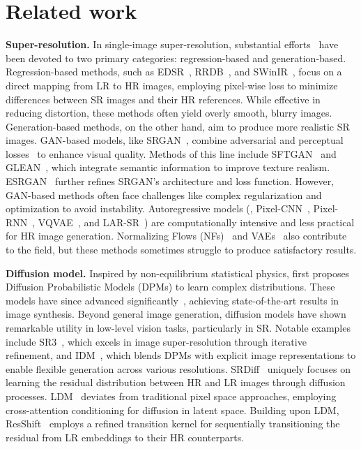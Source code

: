 \section{Related work}
\label{sec:related}
\noindent\textbf{Super-resolution.} 
In single-image super-resolution, substantial efforts~\cite{liang2022details, jo2021tackling, ledig2017photo, zhang2018image, soh2019natural,
ding2022sparsity, ding2021cdfi, geng2022rstt,
 zhang2020deep, zhang2021designing, zhang2018residual, anwar2020densely} have been devoted to two primary categories: regression-based and generation-based. Regression-based methods, such as EDSR~\cite{lim2017enhanced}, RRDB~\cite{wang2018esrgan}, and SWinIR~\cite{liang2021swinir}, focus on a direct mapping from LR to HR images, employing pixel-wise loss to minimize differences between SR images and their HR references. While effective in reducing distortion, these methods often yield overly smooth, blurry images. Generation-based methods, on the other hand, aim to produce more realistic SR images. GAN-based models, like SRGAN~\cite{ledig2017photo}, combine adversarial and perceptual losses~\cite{zhang2018unreasonable} to enhance visual quality. Methods of this line include SFTGAN~\cite{wang2018recovering} and GLEAN~\cite{chan2021glean}, which integrate semantic information to improve texture realism. ESRGAN~\cite{wang2018esrgan} further refines SRGAN’s architecture and loss function. However, GAN-based methods often face challenges like complex regularization and optimization to avoid instability. Autoregressive models (\eg, Pixel-CNN~\cite{van2016pixel}, Pixel-RNN~\cite{oord-nips-2016}, VQVAE~\cite{van2017neural}, and LAR-SR~\cite{guo2022lar}) are computationally intensive and less practical for HR image generation. Normalizing Flows (NFs)~\cite{dinh2016density,Kingma2018} and VAEs~\cite{Kingma2013,vahdat2021nvae} also contribute to the field, but these methods sometimes struggle to produce satisfactory results.

\textbf{Diffusion model.}
Inspired by non-equilibrium statistical physics, \cite{sohl2015deep} first proposes Diffusion Probabilistic Models (DPMs) to learn complex distributions. These models have since advanced significantly~\cite{ho2020denoising, song2021denoising, nichol2021improved, dhariwal2021diffusion}, achieving state-of-the-art results in image synthesis.  Beyond general image generation, diffusion models have shown remarkable utility in low-level vision tasks, particularly in SR. Notable examples include SR3~\cite{saharia2022image}, which excels in image super-resolution through iterative refinement, and IDM~\cite{gao2023implicit}, which blends DPMs with explicit image representations to enable flexible generation across various resolutions. SRDiff~\cite{li2022srdiff} uniquely focuses on learning the residual distribution between HR and LR images through diffusion processes. LDM~\cite{rombach2022high} deviates from traditional pixel space approaches, employing cross-attention conditioning for diffusion in latent space. Building upon LDM, ResShift~\cite{yue2023resshift} employs a refined transition kernel for sequentially transitioning the residual from LR embeddings to their HR counterparts. 

